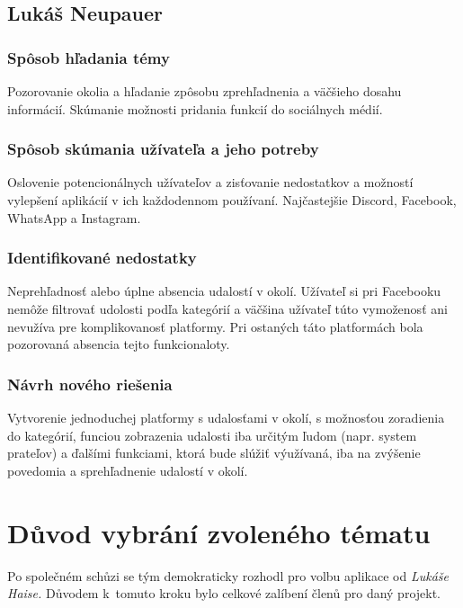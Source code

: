 \documentclass[12pt, titlepage]{article}
\begin{document}
\subsection{Lukáš Neupauer}
	\subsubsection{Spôsob hľadania témy}
Pozorovanie okolia a hľadanie zpôsobu zprehľadnenia a väčšieho dosahu informácií. Skúmanie možnosti pridania funkcií do sociálnych médií.

	\subsubsection{Spôsob skúmania užívateľa a jeho potreby}
Oslovenie potencionálnych užívateľov a zisťovanie nedostatkov a možností vylepšení aplikácií v ich každodennom používaní. Najčastejšie Discord, Facebook, WhatsApp a Instagram. 

	\subsubsection{Identifikované nedostatky}
Neprehľadnosť alebo úplne absencia udalostí v okolí. Užívateľ si pri Facebooku nemôže filtrovať udolosti podľa kategórií a väčšina užívateľ túto vymoženosť ani nevužíva pre komplikovanosť platformy. Pri ostaných táto platformách bola pozorovaná absencia tejto funkcionaloty. 

	\subsubsection{Návrh nového riešenia}
Vytvorenie jednoduchej platformy s udalosťami v okolí, s možnosťou zoradienia do kategórií, funciou zobrazenia udalosti iba určitým ľudom (napr. system prateľov) a ďalšími funkciami, ktorá bude slúžiť výužívaná, iba na zvýšenie povedomia a sprehľadnenie udalostí v okolí. 



\newpage



\section{Důvod vybrání zvoleného tématu}
Po společném schůzi se tým demokraticky rozhodl pro volbu aplikace od \emph{Lukáše Haise.} Důvodem k~tomuto kroku bylo celkové zalíbení členů pro daný projekt.
\end{document}
